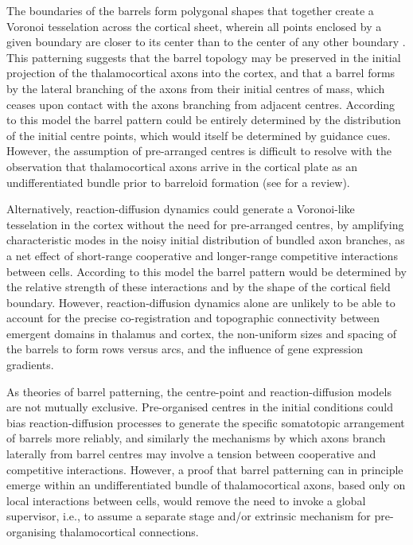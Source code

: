 \documentclass[a4paper,11pt]{article}
\begin{document}
The boundaries of the barrels form polygonal shapes that together create a
Voronoi tesselation across the cortical sheet, wherein all points enclosed by
a given boundary are closer to its center than to the center of any other
boundary \citep{Senft1991}. This patterning suggests that the barrel topology
may be preserved in the initial projection of the thalamocortical axons into
the cortex, and that a barrel forms by the lateral branching of the axons from
their initial centres of mass, which ceases upon contact with the axons
branching from adjacent centres. According to this model the barrel pattern
could be entirely determined by the distribution of the initial centre points,
which would itself be determined by guidance cues. However, the assumption of
pre-arranged centres is difficult to resolve with the observation that
thalamocortical axons arrive in the cortical plate as an undifferentiated
bundle prior to barreloid formation (see \citealp{Erzurumlu2012} for a
review).

Alternatively, reaction-diffusion dynamics could generate a Voronoi-like
tesselation in the cortex without the need for pre-arranged centres, by
amplifying characteristic modes in the noisy initial distribution of bundled
axon branches, as a net effect of short-range cooperative and longer-range
competitive interactions between cells. According to this model the barrel
pattern would be determined by the relative strength of these interactions and
by the shape of the cortical field boundary. However, reaction-diffusion
dynamics alone are unlikely to be able to account for the precise
co-registration and topographic connectivity between emergent domains in
thalamus and cortex, the non-uniform sizes and spacing of the barrels to form
rows versus arcs, and the influence of gene expression gradients.

As theories of barrel patterning, the centre-point and reaction-diffusion
models are not mutually exclusive. Pre-organised centres in the initial
conditions could bias reaction-diffusion processes to generate the specific
somatotopic arrangement of barrels more reliably, and similarly the mechanisms
by which axons branch laterally from barrel centres may involve a tension
between cooperative and competitive interactions. However, a proof that barrel
patterning can in principle emerge within an undifferentiated bundle of
thalamocortical axons, based only on local interactions between cells, would
remove the need to invoke a global supervisor, i.e., to assume a separate
stage and/or extrinsic mechanism for pre-organising thalamocortical
connections.
\end{document}
